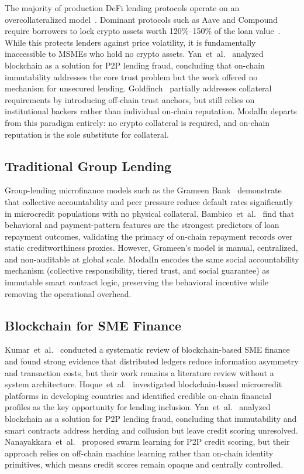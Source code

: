 \documentclass[conference]{IEEEtran}
\begin{document}
The majority of production DeFi lending protocols operate on an
overcollateralized model~\cite{b20}. Dominant protocols such as Aave and
Compound require borrowers to lock crypto assets worth 120\%--150\% of the
loan value~\cite{b7}. While this protects lenders against price volatility,
it is fundamentally inaccessible to MSMEs who hold no crypto assets.
Yan~et~al.~\cite{b7} analyzed blockchain as a solution for P2P lending
fraud, concluding that on-chain immutability addresses the core trust problem
but the work offered no mechanism for unsecured lending.
Goldfinch~\cite{b14} partially addresses collateral requirements
by introducing off-chain trust anchors, but still relies on institutional
backers rather than individual on-chain reputation. ModalIn departs from this
paradigm entirely: no crypto collateral is required, and on-chain reputation
is the sole substitute for collateral.

\subsection{Traditional Group Lending}

Group-lending microfinance models such as the Grameen Bank~\cite{b13}
demonstrate that collective accountability and peer pressure reduce default
rates significantly in microcredit populations with no physical collateral.
Bambico~et~al.~\cite{b21} find that behavioral and payment-pattern features
are the strongest predictors of loan repayment outcomes, validating the
primacy of on-chain repayment records over static creditworthiness proxies.
However, Grameen's model is manual, centralized, and non-auditable at global
scale. ModalIn encodes the same social accountability mechanism (collective
responsibility, tiered trust, and social guarantee) as immutable smart
contract logic, preserving the behavioral incentive while removing the
operational overhead.

\subsection{Blockchain for SME Finance}

Kumar~et~al.~\cite{b4} conducted a systematic review of blockchain-based SME
finance and found strong evidence that distributed ledgers reduce information
asymmetry and transaction costs, but their work remains a literature review
without a system architecture. Hoque~et~al.~\cite{b3} investigated blockchain-based microcredit platforms
in developing countries and identified credible on-chain financial profiles
as the key opportunity for lending inclusion.
Yan~et~al.~\cite{b7} analyzed blockchain as a solution for P2P lending fraud,
concluding that immutability and smart contracts address herding and collusion
but leave credit scoring unresolved. Nanayakkara~et~al.~\cite{b5} proposed swarm
learning for P2P credit scoring, but their approach relies on off-chain
machine learning rather than on-chain identity primitives, which means credit
scores remain opaque and centrally controlled.
\end{document}
